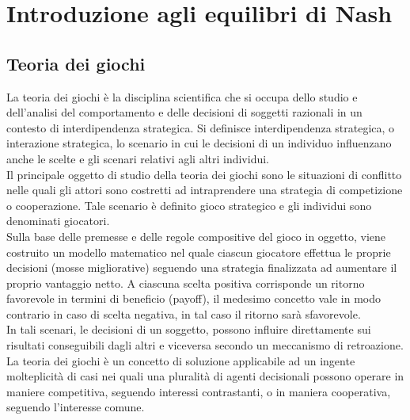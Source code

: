 \chapter{Introduzione agli equilibri di Nash}

\section{Teoria dei giochi}
\justify
La teoria dei giochi è la disciplina scientifica che si occupa dello studio e dell'analisi del comportamento e delle decisioni di soggetti razionali in un contesto di interdipendenza strategica. Si definisce interdipendenza strategica, o interazione strategica, lo scenario in cui le decisioni di un individuo influenzano anche le scelte e gli scenari relativi agli altri individui.\\
Il principale oggetto di studio della teoria dei giochi sono le situazioni di conflitto nelle quali gli attori sono costretti ad intraprendere una strategia di competizione o cooperazione. Tale scenario è definito gioco strategico e gli individui sono denominati giocatori.\\
Sulla base delle premesse e delle regole compositive del gioco in oggetto, viene costruito un modello matematico nel quale ciascun giocatore effettua le proprie decisioni (mosse migliorative) seguendo una strategia finalizzata ad aumentare il proprio vantaggio netto. A ciascuna scelta positiva corrisponde un ritorno favorevole in termini di beneficio (payoff), il medesimo concetto vale in modo contrario in caso di scelta negativa, in tal caso il ritorno sarà sfavorevole.\\
In tali scenari, le decisioni di un soggetto, possono influire direttamente sui risultati conseguibili dagli altri e viceversa secondo un meccanismo di retroazione.\\
La teoria dei giochi è un concetto di soluzione applicabile ad un ingente molteplicità di casi nei quali una pluralità di agenti decisionali possono operare in maniere competitiva, seguendo interessi contrastanti, o in maniera cooperativa, seguendo l'interesse comune.\\

